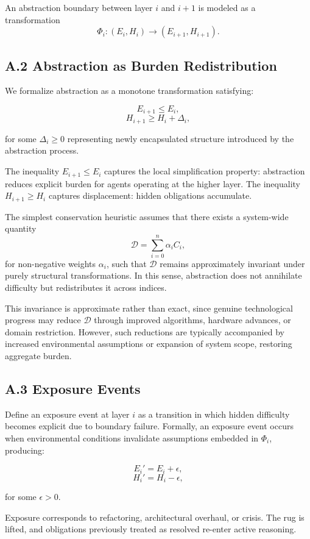 \documentclass[11pt]{article}
\begin{document}
An abstraction boundary between layer $i$ and $i+1$ is modeled as a transformation
\[
\Phi_i : (E_i, H_i) \longrightarrow (E_{i+1}, H_{i+1}).
\]

\subsection{A.2 Abstraction as Burden Redistribution}

We formalize abstraction as a monotone transformation satisfying:

\[
E_{i+1} \leq E_i,
\]
\[
H_{i+1} \geq H_i + \Delta_i,
\]

for some $\Delta_i \geq 0$ representing newly encapsulated structure introduced by the abstraction process.

The inequality $E_{i+1} \leq E_i$ captures the local simplification property: abstraction reduces explicit burden for agents operating at the higher layer. The inequality $H_{i+1} \geq H_i$ captures displacement: hidden obligations accumulate.

The simplest conservation heuristic assumes that there exists a system-wide quantity
\[
\mathcal{D} = \sum_{i=0}^n \alpha_i C_i,
\]
for non-negative weights $\alpha_i$, such that $\mathcal{D}$ remains approximately invariant under purely structural transformations. In this sense, abstraction does not annihilate difficulty but redistributes it across indices.

This invariance is approximate rather than exact, since genuine technological progress may reduce $\mathcal{D}$ through improved algorithms, hardware advances, or domain restriction. However, such reductions are typically accompanied by increased environmental assumptions or expansion of system scope, restoring aggregate burden.

\subsection{A.3 Exposure Events}

Define an exposure event at layer $i$ as a transition in which hidden difficulty becomes explicit due to boundary failure. Formally, an exposure event occurs when environmental conditions invalidate assumptions embedded in $\Phi_i$, producing:

\[
E_i' = E_i + \epsilon,
\]
\[
H_i' = H_i - \epsilon,
\]

for some $\epsilon > 0$.

Exposure corresponds to refactoring, architectural overhaul, or crisis. The rug is lifted, and obligations previously treated as resolved re-enter active reasoning.
\end{document}
